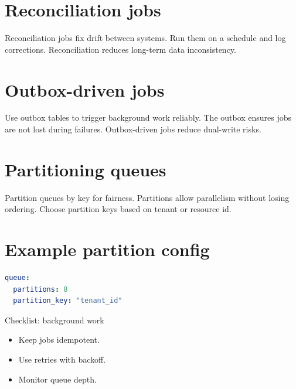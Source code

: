 \section{Reconciliation jobs}
Reconciliation jobs fix drift between systems.
Run them on a schedule and log corrections.
Reconciliation reduces long-term data inconsistency.

\section{Outbox-driven jobs}
Use outbox tables to trigger background work reliably.
The outbox ensures jobs are not lost during failures.
Outbox-driven jobs reduce dual-write risks.

\section{Partitioning queues}
Partition queues by key for fairness.
Partitions allow parallelism without losing ordering.
Choose partition keys based on tenant or resource id.

\section{Example partition config}
\begin{lstlisting}[language=YAML]
queue:
  partitions: 8
  partition_key: "tenant_id"
\end{lstlisting}

\begin{checklistbox}{Checklist: background work}
\begin{itemize}[nosep]
  \item Keep jobs idempotent.
  \item Use retries with backoff.
  \item Monitor queue depth.
\end{itemize}
\end{checklistbox}
